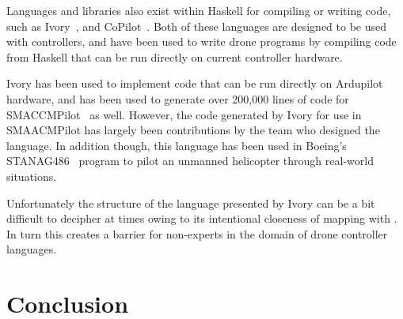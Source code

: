 \documentclass{sig-alternate-05-2015}
\begin{document}
Languages and libraries also exist within Haskell for compiling or writing
 code, such as Ivory~\cite{Eea15ivory}, and
CoPilot~\cite{PGMN10copilot}. Both of these languages are designed to be
used with controllers, and have been used to write drone programs by compiling
 code from Haskell that can be run directly on current controller
hardware.

Ivory has been used to implement code that can be run directly on Ardupilot
hardware, and has been used to generate over 200,000 lines of code for
SMACCMPilot~\cite{Hea14build} as well. However, the code generated by
Ivory for use in SMAACMPilot has largely been contributions by the team who
designed the language. In addition though, this language has been used in
Boeing's STANAG486~\cite{B16little} program to pilot an unmanned
helicopter through real-world situations.

Unfortunately the structure of the language presented by Ivory can be a bit
difficult to decipher at times owing to its intentional closeness of mapping
with . In turn this creates a barrier for non-experts in the domain of
drone controller languages.

\section{Conclusion}
\label{sec:conclusion}



\end{document}
